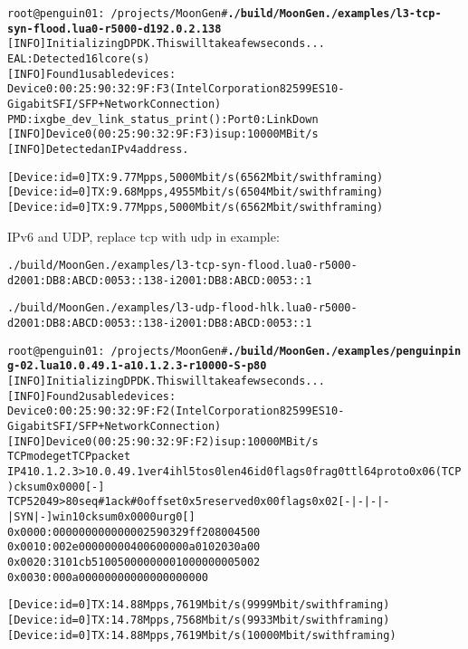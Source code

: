 \documentclass[Screen16to9,17pt]{foils}
\begin{document}

\begin{alltt}\footnotesize
root@penguin01:~/projects/MoonGen# {\bfseries ./build/MoonGen ./examples/l3-tcp-syn-flood.lua 0 -r 5000 -d 192.0.2.138}
[INFO]  Initializing DPDK. This will take a few seconds...
EAL: Detected 16 lcore(s)
[INFO]  Found 1 usable devices:
   Device 0: 00:25:90:32:9F:F3 (Intel Corporation 82599ES 10-Gigabit SFI/SFP+ Network Connection)
PMD: ixgbe_dev_link_status_print():  Port 0: Link Down
[INFO]  Device 0 (00:25:90:32:9F:F3) is up: 10000 MBit/s
[INFO]  Detected an IPv4 address.

[Device: id=0] TX: 9.77 Mpps, 5000 Mbit/s (6562 Mbit/s with framing)
[Device: id=0] TX: 9.68 Mpps, 4955 Mbit/s (6504 Mbit/s with framing)
[Device: id=0] TX: 9.77 Mpps, 5000 Mbit/s (6562 Mbit/s with framing)
\end{alltt}

IPv6 and UDP, replace tcp with udp in example:
\begin{alltt}\footnotesize
./build/MoonGen ./examples/l3-tcp-syn-flood.lua 0 -r 5000 -d 2001:DB8:ABCD:0053::138 -i 2001:DB8:ABCD:0053::1

./build/MoonGen ./examples/l3-udp-flood-hlk.lua 0 -r 5000 -d 2001:DB8:ABCD:0053::138 -i 2001:DB8:ABCD:0053::1
\end{alltt}



\begin{alltt}\footnotesize
root@penguin01:~/projects/MoonGen# {\bfseries ./build/MoonGen ./examples/penguinping-02.lua 10.0.49.1 -a 10.1.2.3 -r 10000 -S -p 80}
[INFO]  Initializing DPDK. This will take a few seconds...
[INFO]  Found 2 usable devices:
   Device 0: 00:25:90:32:9F:F2 (Intel Corporation 82599ES 10-Gigabit SFI/SFP+ Network Connection)
[INFO]  Device 0 (00:25:90:32:9F:F2) is up: 10000 MBit/s
TCP mode get TCP packet
IP4 10.1.2.3 > 10.0.49.1 ver 4 ihl 5 tos 0 len 46 id 0 flags 0 frag 0 ttl 64 proto 0x06 (TCP) cksum 0x0000 [-]
TCP 52049 > 80 seq# 1 ack# 0 offset 0x5 reserved 0x00 flags 0x02 [-|-|-|-|SYN|-] win 10 cksum 0x0000 urg 0 []
  0x0000:   0000 0000 0000 0025 9032 9ff2 0800 4500
  0x0010:   002e 0000 0000 4006 0000 0a01 0203 0a00
  0x0020:   3101 cb51 0050 0000 0001 0000 0000 5002
  0x0030:   000a 0000 0000 0000 0000 0000

[Device: id=0] TX: 14.88 Mpps, 7619 Mbit/s (9999 Mbit/s with framing)
[Device: id=0] TX: 14.78 Mpps, 7568 Mbit/s (9933 Mbit/s with framing)
[Device: id=0] TX: 14.88 Mpps, 7619 Mbit/s (10000 Mbit/s with framing)
\end{alltt}
\end{document}
